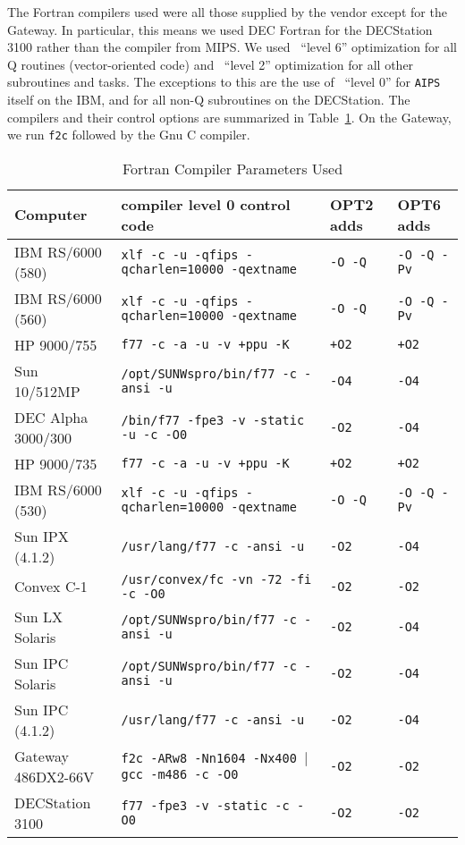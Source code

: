 The Fortran compilers used were all those supplied by the vendor
except for the Gateway.  In particular, this means we used DEC Fortran
for the DECStation 3100 rather than the compiler from \hbox{MIPS}.  We
used \AIPS\ ``level 6'' optimization for all Q routines
(vector-oriented code) and \AIPS\ ``level 2'' optimization for all
other subroutines and tasks.  The exceptions to this are the use of
\AIPS\ ``level 0'' for {\tt AIPS} itself on the IBM, and for all non-Q
subroutines on the DECStation.  The compilers and their control
options are summarized in Table~\ref{ta:fortrans}.  On the Gateway,
we run {\tt f2c} followed by the Gnu C compiler.
\begin{table}
\protect\begin{center}
\protect\begin{tabular}{|l|l|l|l|} \hline
Computer          & compiler level 0 control code &
                    OPT2 adds &
                    OPT6 adds \\
\hline
IBM RS/6000 (580) & {\tt xlf -c -u -qfips -qcharlen=10000 -qextname} &
                    {\tt -O -Q} &
                    {\tt -O -Q -Pv} \\
IBM RS/6000 (560) & {\tt xlf -c -u -qfips -qcharlen=10000 -qextname} &
                    {\tt -O -Q} &
                    {\tt -O -Q -Pv} \\
HP 9000/755       & {\tt f77 -c -a -u -v +ppu -K} &
                    {\tt +O2} & {\tt +O2} \\
Sun 10/512MP      & {\tt /opt/SUNWspro/bin/f77 -c -ansi -u} &
                    {\tt -O4} & {\tt -O4} \\
DEC Alpha 3000/300& {\tt /bin/f77 -fpe3 -v -static -u -c -O0} &
                    {\tt -O2} & {\tt -O4} \\
HP 9000/735       & {\tt f77 -c -a -u -v +ppu -K} &
                    {\tt +O2} & {\tt +O2} \\
IBM RS/6000 (530) & {\tt xlf -c -u -qfips -qcharlen=10000 -qextname} &
                    {\tt -O -Q} &
                    {\tt -O -Q -Pv} \\
Sun IPX (4.1.2)   & {\tt /usr/lang/f77 -c -ansi -u} &
                    {\tt -O2} & {\tt -O4} \\
Convex C-1        & {\tt /usr/convex/fc -vn -72 -fi -c -O0} &
                    {\tt -O2} & {\tt -O2} \\
Sun LX Solaris    & {\tt /opt/SUNWspro/bin/f77 -c -ansi -u} &
                    {\tt -O2} & {\tt -O4} \\
Sun IPC Solaris   & {\tt /opt/SUNWspro/bin/f77 -c -ansi -u} &
                    {\tt -O2} & {\tt -O4} \\
Sun IPC (4.1.2)   & {\tt /usr/lang/f77 -c -ansi -u} &
                    {\tt -O2} & {\tt -O4} \\
Gateway 486DX2-66V& {\tt f2c -ARw8 -Nn1604 -Nx400 $|$ gcc -m486 -c -O0} &
                    {\tt -O2} & {\tt -O2} \\
DECStation 3100   & {\tt f77 -fpe3 -v -static -c -O0} &
                    {\tt -O2} & {\tt -O2} \\
\hline
\end{tabular}
\end{center}
\caption{Fortran Compiler Parameters Used}
\label{ta:fortrans}
\end{table}
